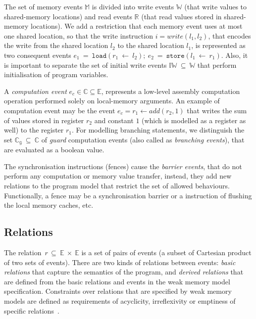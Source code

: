The set of memory events $\mathbb{M}$ is divided into write events $\mathbb{W}$ (that write values to shared-memory locations) and read events $\mathbb{R}$ (that read values stored in shared-memory locations).
We add a restriction that each memory event uses at most one shared location, so that the write instruction $i = write(l_1, l_2)$, that encodes the write from the shared location $l_2$ to the shared location $l_1$, is represented as two consequent events $e_1~=~\mathtt{load}(r_1~\leftarrow~l_2); \ e_2~=~\mathtt{store}(l_1~\leftarrow~r_1)$.
Also, it is important to separate the set of initial write events $\mathbb{IW}~\subseteq~\mathbb{W}$ that perform initialisation of program variables.

A \textit{computation event} $e_c \in \mathbb{C} \subseteq \mathbb{E}$, represents a low-level assembly computation operation performed solely on local-memory arguments.
An example of computation event may be the event $e_c = r_1 \leftarrow add(r_2, 1)$ that writes the sum of values stored in register $r_2$ and constant $1$ (which is modelled as a register as well) to the register $r_1$.
For modelling branching statements, we distinguish the set $\mathbb{C_{g}}~\subseteq~\mathbb{C}$ of \textit{guard} computation events (also called as \textit{branching events}), that are evaluated as a boolean value.

The synchronisation instructions (fences) cause the \textit{barrier events}, that do not perform any computation or memory value transfer, instead, they add new relations to the program model that restrict the set of allowed behaviours.
Functionally, a fence may be a synchronisation barrier or a instruction of flushing the local memory caches, etc.


\subsection{Relations}
\label{ch:wmm:model:relations}


The relation~$r\,\subseteq~\mathbb{E}~\times~\mathbb{E}$ is a set of pairs of events (a subset of Cartesian product of two sets of events). There are two kinds of relations between events: \textit{basic relations} that capture the semantics of the program, and \textit{derived relations} that are defined from the basic relations and events in the weak memory model specification. Constraints over relations that are specified by weak memory models are defined as requirements of acyclicity, irreflexivity or emptiness of specific relations~\cite{alglave2016syntax}.

